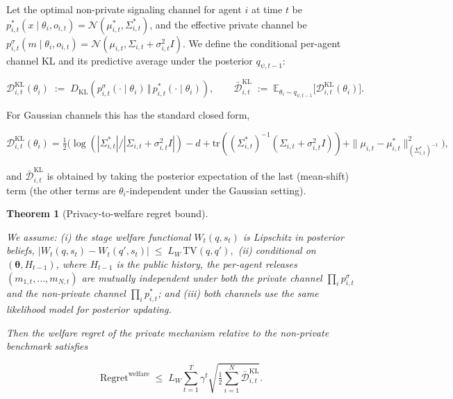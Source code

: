 \documentclass{article}
\newtheorem{theorem}{Theorem}
\begin{document}
Let the optimal non-private signaling channel for agent $i$ at time $t$ be $p_{i,t}^*(x \mid \theta_i, o_{i,t}) = \mathcal{N}(\mu_{i,t}^*, \Sigma_{i,t}^*)$, and the effective private channel be $p_{i,t}^\sigma(m \mid \theta_i, o_{i,t}) = \mathcal{N}(\mu_{i,t}, \Sigma_{i,t} + \sigma_{i,t}^2 I)$. We define the conditional per-agent channel KL and its predictive average under the posterior $q_{\psi,t-1}$:

$$\mathcal{D}_{i,t}^{\mathrm{KL}}(\theta_i) \;:=\; D_{\mathrm{KL}}\!\left(p_{i,t}^\sigma(\cdot \mid \theta_i) \,\Vert\, p_{i,t}^*(\cdot \mid \theta_i)\right), \qquad \bar{\mathcal{D}}_{i,t}^{\mathrm{KL}} \;:=\; \mathbb{E}_{\theta_i \sim q_{\psi,t-1}}\!\big[\mathcal{D}_{i,t}^{\mathrm{KL}}(\theta_i)\big].$$

For Gaussian channels this has the standard closed form,

$$\mathcal{D}_{i,t}^{\mathrm{KL}}(\theta_i) = \tfrac{1}{2}\Big(\log(|\Sigma_{i,t}^*|/|\Sigma_{i,t}+\sigma_{i,t}^2 I|) - d + \mathrm{tr}((\Sigma_{i,t}^*)^{-1}(\Sigma_{i,t}+\sigma_{i,t}^2 I)) + \|\mu_{i,t}-\mu_{i,t}^*\|_{(\Sigma_{i,t}^*)^{-1}}^2\Big),$$

and $\bar{\mathcal D}_{i,t}^{\mathrm{KL}}$ is obtained by taking the posterior expectation of the last (mean-shift) term (the other terms are $\theta_i$-independent under the Gaussian setting).

\begin{theorem} [Privacy-to-welfare regret bound]
    \label{thm:P2W}
    
    We assume: (i) the stage welfare functional $W_t(q, s_t)$ is Lipschitz in posterior beliefs,
    $|W_t(q, s_t) - W_t(q', s_t)| \;\le\; L_W\,\mathrm{TV}(q, q'),$
    (ii) conditional on $(\boldsymbol\theta, H_{t-1})$, where $H_{t-1}$ is the public history, the per-agent releases $(m_{1,t}, \ldots, m_{N,t})$ are mutually independent under both the private channel $\prod_i p_{i,t}^\sigma$ and the non-private channel $\prod_i p_{i,t}^*$; and (iii) both channels use the same likelihood model for posterior updating.

    Then the welfare regret of the private mechanism relative to the non-private benchmark satisfies

    $$\mathrm{Regret}^{\mathrm{welfare}} \;\le\; L_W \sum_{t=1}^T \gamma^t \sqrt{\tfrac{1}{2} \sum_{i=1}^N \bar{\mathcal{D}}_{i,t}^{\mathrm{KL}}}.$$
\end{theorem}
\end{document}

